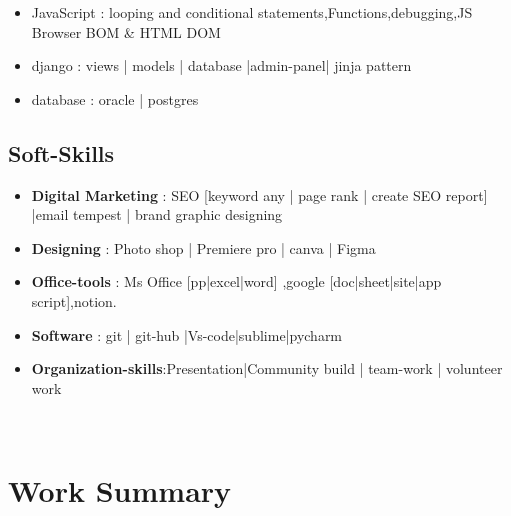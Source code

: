 \documentclass[]{deedy-resume-openfont}
\begin{document}
\begin{itemize}
\item JavaScript : looping and conditional statements,Functions,debugging,JS Browser BOM \& HTML DOM
\end{itemize}

\begin{itemize}
\item django : views | models | database |admin-panel| jinja pattern
\end{itemize}

\begin{itemize}
\item database : oracle | postgres
\end{itemize}

\subsection{Soft-Skills}
\begin{itemize}
\item \textbf{Digital Marketing} : SEO [keyword any | page rank | create SEO report] |email tempest | brand graphic designing
\end{itemize}

\begin{itemize}
\item \textbf{Designing} : Photo shop | Premiere pro | canva | Figma 
\end{itemize}

\begin{itemize}
\item \textbf{Office-tools} : Ms Office [pp|excel|word] ,google [doc|sheet|site|app script],notion.
\end{itemize}

\begin{itemize}
\item \textbf{Software} : git | git-hub |Vs-code|sublime|pycharm
\item \textbf{Organization-skills}:Presentation|Community build | team-work | volunteer work
\end{itemize}\\

\section{Work Summary}

\end{document}
